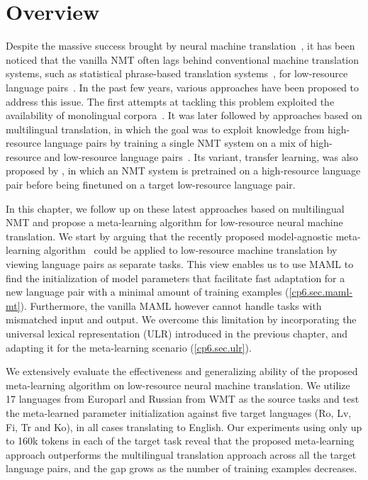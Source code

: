 
\section{Overview}

Despite the massive success brought by neural machine translation~\citep[NMT,][]{sutskever2014sequence,bahdanau2014neural,vaswani2017attention}, it has been noticed that the vanilla NMT often lags behind conventional machine translation systems, such as statistical phrase-based translation systems~\citep[PBMT,][]{koehn2003statistical}, for low-resource language pairs~\citep[see, e.g.,][]{koehn2017six}. In the past few years, various approaches have been proposed to address this issue. The first attempts at tackling this problem exploited the availability of monolingual corpora~\citep{Gulcehre-Orhan-et-al-2015,sennrich2015improving,zhang2016exploiting}. It was later followed by approaches based on multilingual translation, in which the goal was to exploit knowledge from high-resource language pairs by training a single NMT system on a mix of high-resource and low-resource language pairs~\citep{firat2016multi,firat2016zero,lee2016fully,johnson2016google,ha2016toward}. Its variant, transfer learning, was also proposed by \citet{zoph2016transfer}, in which an NMT system is pretrained on a high-resource language pair before being finetuned on a target low-resource language pair.

In this chapter, we follow up on these latest approaches based on multilingual NMT and propose a meta-learning algorithm for low-resource neural machine translation. We start by arguing that the recently proposed model-agnostic meta-learning algorithm~\citep[MAML,][]{finn2017model} could be applied to low-resource machine translation by viewing language pairs as separate tasks. This view enables us to use MAML to find the initialization of model parameters that facilitate fast adaptation for a new language pair with a minimal amount of training examples (\textsection\ref{cp6.sec.maml-mt}). Furthermore, the vanilla MAML however cannot handle tasks with mismatched input and output. We overcome this limitation by incorporating the universal lexical representation (ULR) introduced in the previous chapter, and adapting it for the meta-learning scenario (\textsection\ref{cp6.sec.ulr}).

We extensively evaluate the effectiveness and generalizing ability of the proposed meta-learning algorithm on low-resource neural machine translation. We utilize 17 languages from Europarl and Russian from WMT as the source tasks and test the meta-learned parameter initialization against five target languages (Ro, Lv, Fi, Tr and Ko), in all cases translating to English. Our experiments using only up to 160k tokens in each of the target task reveal that the proposed meta-learning approach outperforms the multilingual translation approach across all the target language pairs, and the gap grows as the number of training examples decreases.



